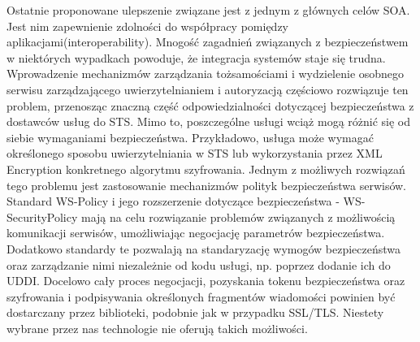 Ostatnie proponowane ulepszenie związane jest z jednym z głównych celów SOA. Jest nim zapewnienie zdolności do współpracy pomiędzy aplikacjami(interoperability). Mnogość zagadnień związanych z bezpieczeństwem w niektórych wypadkach powoduje, że integracja systemów staje się trudna. Wprowadzenie mechanizmów zarządzania tożsamościami i wydzielenie osobnego serwisu zarządzającego uwierzytelnianiem i autoryzacją częściowo rozwiązuje ten problem, przenosząc znaczną część odpowiedzialności dotyczącej bezpieczeństwa z dostawców usług do STS. Mimo to, poszczególne usługi wciąż mogą różnić się od siebie wymaganiami bezpieczeństwa. Przykładowo, usługa może wymagać określonego sposobu uwierzytelniania w STS lub wykorzystania przez XML Encryption konkretnego algorytmu szyfrowania. Jednym z możliwych rozwiązań tego problemu jest zastosowanie mechanizmów polityk bezpieczeństwa serwisów. Standard WS-Policy i jego rozszerzenie dotyczące bezpieczeństwa - WS-SecurityPolicy mają na celu rozwiązanie problemów związanych z możliwością komunikacji serwisów, umożliwiając negocjację parametrów bezpieczeństwa. Dodatkowo standardy te pozwalają na standaryzację wymogów bezpieczeństwa oraz zarządzanie nimi niezależnie od kodu usługi, np. poprzez dodanie ich do UDDI. Docelowo cały proces negocjacji, pozyskania tokenu bezpieczeństwa oraz szyfrowania i podpisywania określonych fragmentów wiadomości powinien być dostarczany przez biblioteki, podobnie jak w przypadku SSL/TLS.  Niestety wybrane przez nas technologie nie oferują takich możliwości.


